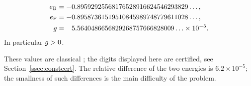 \begin{proposition}\label{prop:constants}
\begin{align*}
  e_{\mathrm B}&=-0.89592925568176528916624546293829\ldots,\\
  e_{\mathrm F}&=-0.89587361519510845989748779611028\ldots,\\
  g&=\phantom{-}5.5640486656829268757666828009\ldots\times10^{-5}.
\end{align*}
In particular $g>0$.
\end{proposition}

These values are classical \cite{Fuchs1935,ColdwellHorsfallMaradudin1960,Foldy1978}; the digits displayed here are certified, see
Section~\ref{ssec:constcert}. The relative difference of the two energies is $6.2\times10^{-5}$; the smallness of such differences is
the main difficulty of the problem.
